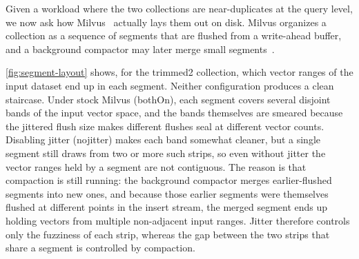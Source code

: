 Given a workload where the two collections are near-duplicates at the
query level, we now ask how Milvus~\cite{wang2021milvus} actually lays
them out on disk. Milvus organizes a collection as a sequence of
segments that are flushed from a write-ahead buffer, and a background
compactor may later merge small segments~\cite{guo2022manu}.

 \autoref{fig:segment-layout} shows, for the trimmed2
collection, which vector ranges of the input dataset end up in each
segment. Neither configuration produces a clean staircase. Under stock
Milvus (bothOn), each segment covers several disjoint bands of the
input vector space, and the bands themselves are smeared because the
jittered flush size makes different flushes seal at different vector
counts. Disabling jitter (nojitter) makes each band somewhat cleaner, but a
single segment still draws from two or more such strips, so even
without jitter the vector ranges held by a segment
are not contiguous. The reason is that compaction is still running:
the background compactor merges earlier-flushed segments into new
ones, and because those earlier segments were themselves flushed at
different points in the insert stream, the merged segment ends up
holding vectors from multiple non-adjacent input ranges. Jitter therefore
controls only the fuzziness of each strip, whereas the gap between the
two strips that share a segment is controlled by compaction.

